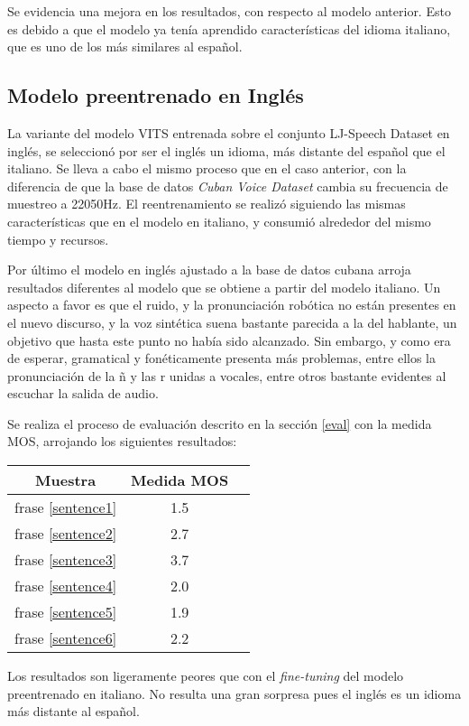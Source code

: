 Se evidencia una mejora en los resultados, con respecto al modelo anterior. Esto es debido a que el modelo ya tenía aprendido características del idioma italiano, que es uno de los más similares al español.


\subsection{Modelo preentrenado en Inglés}
La variante del modelo VITS entrenada sobre el conjunto LJ-Speech Dataset en inglés, se seleccionó por ser el inglés un idioma, más distante del español que el italiano. Se lleva a cabo el mismo proceso que en el caso anterior, con la diferencia de que la base de datos \textit{Cuban Voice Dataset} cambia su frecuencia de muestreo a 22050Hz. 
El reentrenamiento se realizó siguiendo las mismas características que en el modelo en italiano, y consumió alrededor del mismo tiempo y recursos.

Por último el modelo en inglés ajustado a la base de datos cubana arroja resultados diferentes al modelo que se obtiene a partir del modelo italiano. Un aspecto a favor es que el ruido, y la pronunciación robótica no están presentes en el nuevo discurso, y la voz sintética suena bastante parecida a la del hablante, un objetivo que hasta este punto no había sido alcanzado. Sin embargo, y como era de esperar, gramatical y fonéticamente presenta más problemas, entre ellos la pronunciación de la ñ y las r unidas a vocales, entre otros bastante evidentes al escuchar la salida de audio.

Se realiza el proceso de evaluación descrito en la sección \ref{eval} con la medida MOS, arrojando los siguientes resultados:

\begin{center} \begin{tabular}{ |c|c|c| } 
		\hline 
		Muestra & Medida MOS \\
		\hline
		frase \ref{sentence1} & 1.5 \\
		frase \ref{sentence2} & 2.7 \\
		frase \ref{sentence3} & 3.7 \\
		frase \ref{sentence4} & 2.0 \\
		frase \ref{sentence5} & 1.9 \\
		frase \ref{sentence6} & 2.2 \\
		\hline 
	\end{tabular} 
\end{center}

Los resultados son ligeramente peores que con el \textit{fine-tuning} del modelo preentrenado en italiano. No resulta una gran sorpresa pues el inglés es un idioma más distante al español.

